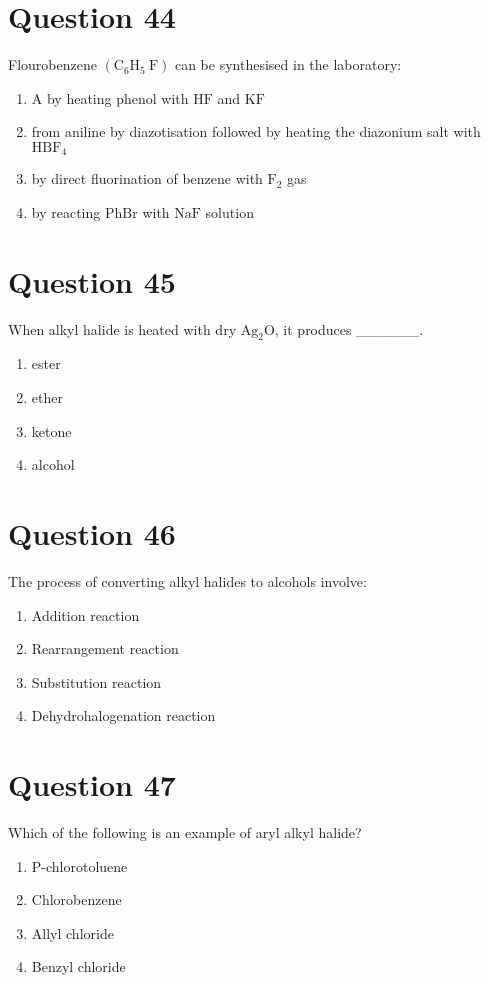 \documentclass{article}
\begin{document}
\section*{Question 44}
Flourobenzene \(\left(\mathrm{C}_6 \mathrm{H}_5 \mathrm{~F}\right)\) can be synthesised in the laboratory:
\begin{enumerate}[label=(\alph*)]
\item A by heating phenol with \(\mathrm{HF}\) and \(\mathrm{KF}\)
\item from aniline by diazotisation followed by heating the diazonium salt with \(\mathrm{HBF}_4\)
\item by direct fluorination of benzene with \(\mathrm{F}_2\) gas
\item by reacting \(\mathrm{PhBr}\) with \(\mathrm{NaF}\) solution
\end{enumerate}
\newpage
\section*{Question 45}
When alkyl halide is heated with dry \(\mathrm{Ag}_2 \mathrm{O}\), it produces ______.
\begin{enumerate}[label=(\alph*)]
\item ester
\item ether
\item ketone
\item alcohol
\end{enumerate}
\newpage
\section*{Question 46}
The process of converting alkyl halides to alcohols involve:
\begin{enumerate}[label=(\alph*)]
\item Addition reaction
\item Rearrangement reaction
\item Substitution reaction
\item Dehydrohalogenation reaction
\end{enumerate}
\newpage
\section*{Question 47}
Which of the following is an example of aryl alkyl halide?
\begin{enumerate}[label=(\alph*)]
\item P-chlorotoluene
\item Chlorobenzene
\item Allyl chloride
\item Benzyl chloride
\end{enumerate}
\newpage
\end{document}
